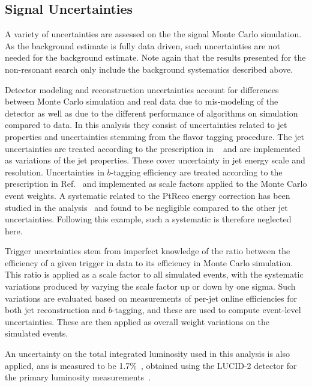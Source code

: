 \FloatBarrier
\subsection{Signal Uncertainties}%
\label{subsec:modelling-uncerts}
A variety of uncertainties are assessed on the the signal Monte Carlo simulation.  
As the background estimate is fully data driven, such uncertainties are not needed for 
the background estimate. Note again that the results presented for the non-resonant search only 
include the background systematics described above.

Detector modeling and reconstruction uncertainties account for differences 
between Monte Carlo simulation and real data due to mis-modeling of the detector
as well as due to the different performance of algorithms on simulation compared to data. 
In this analysis they consist of uncertainties related to jet properties and uncertainties stemming 
from the flavor tagging procedure. The jet uncertainties are treated according to the prescription in 
~\cite{JETM-2018-05} and are implemented as variations of the jet properties. These cover 
uncertainty in jet energy scale and resolution. Uncertainties in $b$-tagging efficiency are 
treated according to the prescription in Ref.~\cite{FTAG-2018-01} and implemented 
as scale factors applied to the Monte Carlo event weights. A systematic related to the PtReco \bjet 
energy correction has been studied in the \HepProcess{\higgs\higgs \to \gamma\gamma\Pqb\Paqb} 
analysis~\cite{bbyyNote} and found to be negligible compared to the other jet uncertainties. Following this 
example, such a systematic is therefore neglected here.

Trigger uncertainties stem from imperfect knowledge of the ratio between the
efficiency of a given trigger in data to its efficiency in Monte Carlo
simulation. This ratio is applied as a scale factor to all simulated events, with the 
systematic variations produced by varying the scale factor up or down by one sigma.
Such variations are evaluated based on measurements of per-jet online efficiencies for both jet reconstruction 
and $b$-tagging, and these are used to compute event-level uncertainties.
These are then applied as overall weight variations on the simulated events.

An uncertainty on the total integrated luminosity used in this analysis is also applied, 
ans is measured to be 1.7\%~\cite{ATLAS-CONF-2019-021}, obtained using the LUCID-2 detector for 
the primary luminosity measurements~\cite{Avoni:2633501}.


